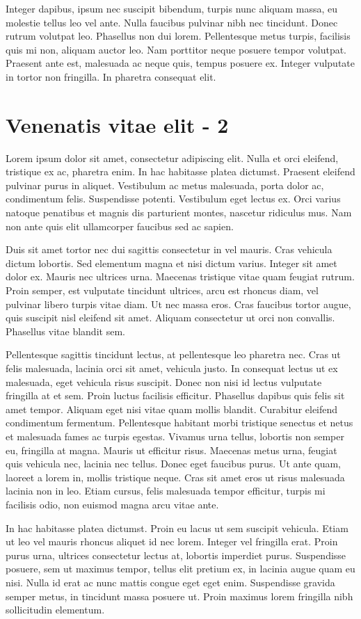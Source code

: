 Integer dapibus, ipsum nec suscipit bibendum, turpis nunc aliquam massa, eu molestie tellus leo vel ante. Nulla faucibus pulvinar nibh nec tincidunt. Donec rutrum volutpat leo. Phasellus non dui lorem. Pellentesque metus turpis, facilisis quis mi non, aliquam auctor leo. Nam porttitor neque posuere tempor volutpat. Praesent ante est, malesuada ac neque quis, tempus posuere ex. Integer vulputate in tortor non fringilla. In pharetra consequat elit.

\section{Venenatis vitae elit - 2}

Lorem ipsum dolor sit amet, consectetur adipiscing elit. Nulla et orci eleifend, tristique ex ac, pharetra enim. In hac habitasse platea dictumst. Praesent eleifend pulvinar purus in aliquet. Vestibulum ac metus malesuada, porta dolor ac, condimentum felis. Suspendisse potenti. Vestibulum eget lectus ex. Orci varius natoque penatibus et magnis dis parturient montes, nascetur ridiculus mus. Nam non ante quis elit ullamcorper faucibus sed ac sapien.

Duis sit amet tortor nec dui sagittis consectetur in vel mauris. Cras vehicula dictum lobortis. Sed elementum magna et nisi dictum varius. Integer sit amet dolor ex. Mauris nec ultrices urna. Maecenas tristique vitae quam feugiat rutrum. Proin semper, est vulputate tincidunt ultrices, arcu est rhoncus diam, vel pulvinar libero turpis vitae diam. Ut nec massa eros. Cras faucibus tortor augue, quis suscipit nisl eleifend sit amet. Aliquam consectetur ut orci non convallis. Phasellus vitae blandit sem.

Pellentesque sagittis tincidunt lectus, at pellentesque leo pharetra nec. Cras ut felis malesuada, lacinia orci sit amet, vehicula justo. In consequat lectus ut ex malesuada, eget vehicula risus suscipit. Donec non nisi id lectus vulputate fringilla at et sem. Proin luctus facilisis efficitur. Phasellus dapibus quis felis sit amet tempor. Aliquam eget nisi vitae quam mollis blandit. Curabitur eleifend condimentum fermentum. Pellentesque habitant morbi tristique senectus et netus et malesuada fames ac turpis egestas. Vivamus urna tellus, lobortis non semper eu, fringilla at magna. Mauris ut efficitur risus. Maecenas metus urna, feugiat quis vehicula nec, lacinia nec tellus. Donec eget faucibus purus. Ut ante quam, laoreet a lorem in, mollis tristique neque. Cras sit amet eros ut risus malesuada lacinia non in leo. Etiam cursus, felis malesuada tempor efficitur, turpis mi facilisis odio, non euismod magna arcu vitae ante.

In hac habitasse platea dictumst. Proin eu lacus ut sem suscipit vehicula. Etiam ut leo vel mauris rhoncus aliquet id nec lorem. Integer vel fringilla erat. Proin purus urna, ultrices consectetur lectus at, lobortis imperdiet purus. Suspendisse posuere, sem ut maximus tempor, tellus elit pretium ex, in lacinia augue quam eu nisi. Nulla id erat ac nunc mattis congue eget eget enim. Suspendisse gravida semper metus, in tincidunt massa posuere ut. Proin maximus lorem fringilla nibh sollicitudin elementum.
